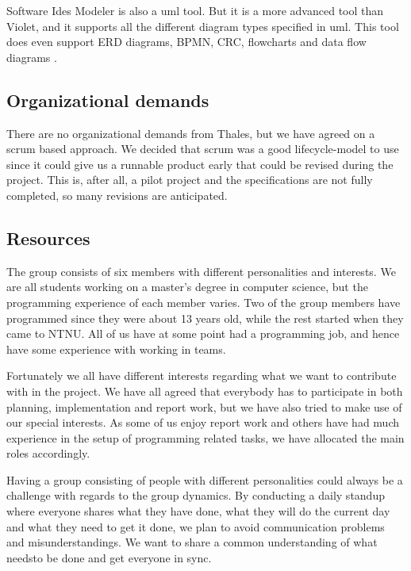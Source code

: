 Software Ides Modeler is also a \gls{uml} tool. But it is a more advanced tool than Violet, and it supports all the different diagram types specified in \gls{uml}. This tool does even support ERD diagrams, BPMN, CRC, flowcharts and data flow diagrams \cite{bib:sim}.

\subsection{Organizational demands}
There are no organizational demands from Thales, but we have agreed on a scrum based approach. We decided that scrum was a good lifecycle-model to use since it could give us a runnable product early that could be revised during the project. This is, after all, a pilot project and the specifications are not fully completed, so many revisions are anticipated.

\subsection{Resources}
The group consists of six members with different personalities and interests. We are all students working on a master's degree in computer science, but the programming experience of each member varies. Two of the group members have programmed since they were about 13 years old, while the rest started when they came to NTNU. All of us have at some point had a programming job, and hence have some experience with working in teams.

\newpage

Fortunately we all have different interests regarding what we want to contribute with in the project. We have all agreed that everybody has to participate in both planning, implementation and report work, but we have also tried to make use of our special interests. As some of us enjoy report work and others have had much experience in the setup of programming related tasks, we have allocated the main roles accordingly.

\newline
\newline
Having a group consisting of people with different personalities could always be a challenge with regards to the group dynamics. By conducting a daily standup where everyone shares what they have done, what they will do the current day and what they need to get it done, we plan to avoid communication problems and misunderstandings. We want to share a common understanding of what needsto be done and get everyone in sync. 

